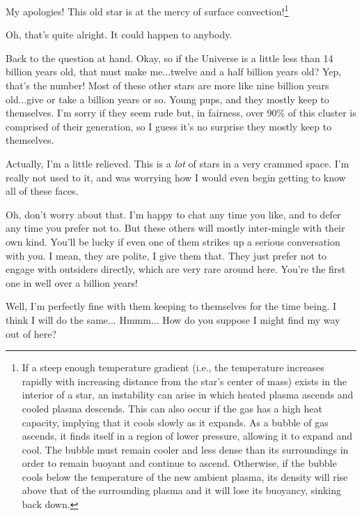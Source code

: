 \documentclass[main.tex]{subfiles}
\begin{document}
\par \Enrico My apologies!  This old star is at the mercy of surface convection!\footnote{If a steep enough temperature gradient (i.e., the temperature increases rapidly with increasing distance from the star's center of mass) exists in the interior of a star, an instability can arise in which heated plasma ascends and cooled plasma descends. This can also occur if the gas has a high heat capacity, implying that it cools slowly as it expands.  As a bubble of gas ascends, it finds itself in a region of lower pressure, allowing it to expand and cool.  The bubble must remain cooler and less dense than its surroundings in order to remain buoyant and continue to ascend.  Otherwise, if the bubble cools below the temperature of the new ambient plasma, its density will rise above that of the surrounding plasma and it will lose its buoyancy, sinking back down.}

\par \Sterope Oh, that's quite alright.  It could happen to anybody.

\par \Enrico Back to the question at hand.  Okay, so if the Universe is a little less than 14 billion years old, that must make me...twelve and a half billion years old?  Yep, that's the number!  Most of these other stars are more like nine billion years old...give or take a billion years or so.  Young pups, and they mostly keep to themselves.  I'm sorry if they seem rude but, in fairness, over 90\% of this cluster is comprised of their generation, so I guess it's no surprise they mostly keep to themselves.  

\par \Sterope Actually, I'm a little relieved.  This is a \textit{lot} of stars in a very crammed space.  I'm really not used to it, and was worrying how I would even begin getting to know all of these faces.

\par \Enrico Oh, don't worry about that.  I'm happy to chat any time you like, and to defer any time you prefer not to.  But these others will mostly inter-mingle with their own kind.  You'll be lucky if even one of them strikes up a serious conversation with you.  I mean, they are polite, I give them that.  They just prefer not to engage with outsiders directly, which are very rare around here.  You're the first one in well over a billion years!  

\par \Sterope Well, I'm perfectly fine with them keeping to themselves for the time being.  I think I will do the same... Hmmm... How do you suppose I might find my way out of here?
\end{document}
